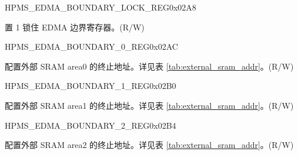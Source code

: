 \begin{register}{H}{PMS\_EDMA\_BOUNDARY\_LOCK\_REG}{0x{}02A8}\label{regdesc:PMSEDMABOUNDARYLOCKREG}
%
%
\regnewline%
\begin{regdesc}\begin{reglist}
\label{fielddesc:PMSEDMABOUNDARYLOCK}\item [PMS\_EDMA\_BOUNDARY\_LOCK] 置 1 锁住 EDMA 边界寄存器。(R/W)
\end{reglist}\end{regdesc}
\end{register}


\begin{register}{H}{PMS\_EDMA\_BOUNDARY\_0\_REG}{0x{}02AC}\label{regdesc:PMSEDMABOUNDARY0REG}
%
%
\regnewline%
\begin{regdesc}\begin{reglist}
\label{fielddesc:PMSEDMABOUNDARY0}\item [PMS\_EDMA\_BOUNDARY\_0] 配置外部 SRAM area0 的终止地址。详见表 \ref{tab:external_sram_addr}。(R/W)
\end{reglist}\end{regdesc}
\end{register}


\begin{register}{H}{PMS\_EDMA\_BOUNDARY\_1\_REG}{0x{}02B0}\label{regdesc:PMSEDMABOUNDARY1REG}
%
%
\regnewline%
\begin{regdesc}\begin{reglist}
\label{fielddesc:PMSEDMABOUNDARY1}\item [PMS\_EDMA\_BOUNDARY\_1] 配置外部 SRAM area1 的终止地址。详见表 \ref{tab:external_sram_addr}。(R/W)
\end{reglist}\end{regdesc}
\end{register}


\begin{register}{H}{PMS\_EDMA\_BOUNDARY\_2\_REG}{0x{}02B4}\label{regdesc:PMSEDMABOUNDARY2REG}
%
%
\regnewline%
\begin{regdesc}\begin{reglist}
\label{fielddesc:PMSEDMABOUNDARY2}\item [PMS\_EDMA\_BOUNDARY\_2] 配置外部 SRAM area2 的终止地址。详见表 \ref{tab:external_sram_addr}。(R/W)
\end{reglist}\end{regdesc}
\end{register}


